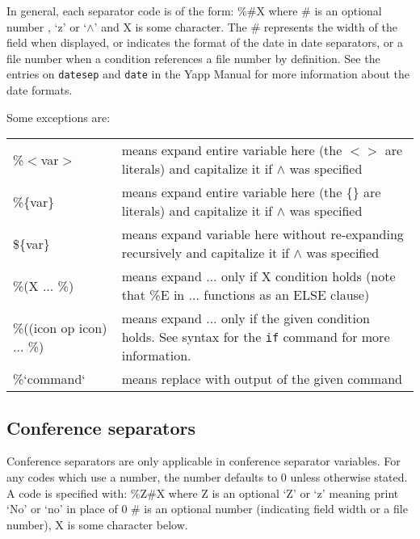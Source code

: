 \documentclass[twoside]{report}
\begin{document}
      In general, each separator code is of the form: \%\#X
      where \# is an optional number , `z' or `$\wedge$'
      and X is some character.  The \# represents the
      width of the field when displayed, or indicates the format 
      of the date in date separators, or a file number when a condition 
      references a file number by definition.  See the entries on 
      {\tt datesep} and {\tt date} in the Yapp Manual for 
      more information about the date formats.

      Some exceptions are:

      \begin{tabular}{lp{10cm}}
      \%$<$var$>$  &   means expand entire variable here (the $<>$ are literals) and
                 capitalize it if $\wedge$ was specified \\

      \%\{var\}  &   means expand entire variable here (the \{\} are literals) and
                 capitalize it if $\wedge$ was specified \\

      \$\{var\}  &   means expand variable here without re-expanding recursively
                 and capitalize it if $\wedge$ was specified \\

      \%(X ... \%)& means expand ... only if X condition holds (note that
                 \%E in ... functions as an ELSE clause) \\

      \%((icon op icon) ... \%) & means expand ... only if the given condition
                 holds.  See syntax for the {\tt if} command for more information. \\

      \%`command` &means replace with output of the given command \\
      \end{tabular}



      \subsection{Conference separators }

         Conference separators are only applicable in conference separator
   variables.  For any codes which use a number, the number defaults to 0
   unless otherwise stated.  A code is specified with: \%Z\#X 
      where Z is an optional `Z' or `z' meaning print `No' or `no' in place of 0
        \# is an optional number (indicating field width or a file number),
        X is some character below.
   
\end{document}
